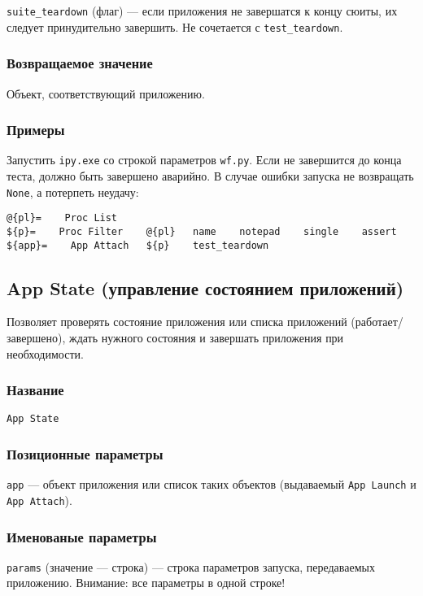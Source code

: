 \documentclass[11pt]{book} %
\begin{document}
\verb"suite_teardown" (флаг) --- если приложения не завершатся к концу сюиты, их следует принудительно завершить. Не сочетается с \verb"test_teardown".

\subsubsection*{Возвращаемое значение} 
Объект, соответствующий приложению.

\subsubsection*{Примеры}
Запустить \verb"ipy.exe" со строкой параметров \verb"wf.py". Если не завершится до конца теста, должно быть завершено аварийно. В случае ошибки запуска не возвращать \verb"None", а потерпеть неудачу:

\begin{verbatim}
@{pl}=    Proc List
${p}=    Proc Filter    @{pl}   name    notepad    single    assert
${app}=    App Attach   ${p}    test_teardown
\end{verbatim}



\subsection{App State (управление состоянием приложений)}
Позволяет проверять состояние приложения или списка приложений (работает/завершено), ждать нужного состояния и завершать приложения при необходимости. 


\subsubsection*{Название} 
\verb"App State"

\subsubsection*{Позиционные параметры} 

\verb"app" --- объект приложения или список таких объектов (выдаваемый \verb"App Launch" и \verb"App Attach").

\subsubsection*{Именованые параметры} 
\verb"params" (значение --- строка) --- строка параметров запуска, передаваемых приложению. Внимание: все параметры в одной строке!
\end{document}

